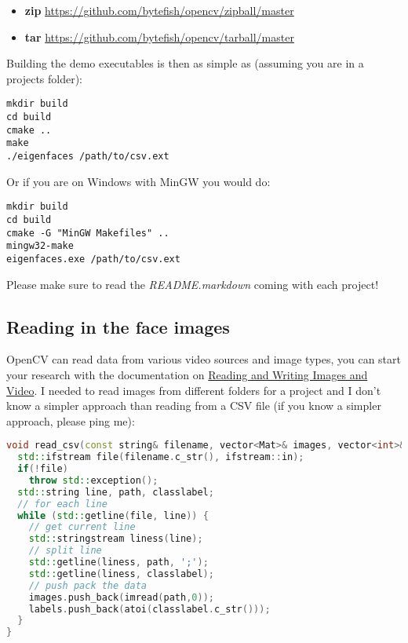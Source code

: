 \begin{itemize}
	\item \textbf{zip} \url{https://github.com/bytefish/opencv/zipball/master}
	\item \textbf{tar} \url{https://github.com/bytefish/opencv/tarball/master}
\end{itemize}

Building the demo executables is then as simple as (assuming you are in a projects folder):
\begin{lstlisting}
mkdir build
cd build
cmake ..
make
./eigenfaces /path/to/csv.ext
\end{lstlisting}

Or if you are on Windows with MinGW you would do:
\begin{lstlisting}
mkdir build
cd build
cmake -G "MinGW Makefiles" ..
mingw32-make
eigenfaces.exe /path/to/csv.ext
\end{lstlisting}

Please make sure to read the \textit{README.markdown} coming with each project!

\subsection{Reading in the face images}

\lstset{language=,}

OpenCV can read data from various video sources and image types, you can start your research with the documentation on \href{http://opencv.willowgarage.com/documentation/cpp/reading_and_writing_images_and_video.html}{Reading and Writing Images and Video}. I needed to read images from different folders for a project and I don't know a simpler approach than reading from a CSV file (if you know a simpler approach, please ping me):

\begin{lstlisting}[language=c++]
void read_csv(const string& filename, vector<Mat>& images, vector<int>& labels) {
  std::ifstream file(filename.c_str(), ifstream::in);
  if(!file)
    throw std::exception();
  std::string line, path, classlabel;
  // for each line
  while (std::getline(file, line)) {
    // get current line
    std::stringstream liness(line);
    // split line
    std::getline(liness, path, ';');
    std::getline(liness, classlabel);
    // push pack the data
    images.push_back(imread(path,0));
    labels.push_back(atoi(classlabel.c_str()));
  }
}
\end{lstlisting}


